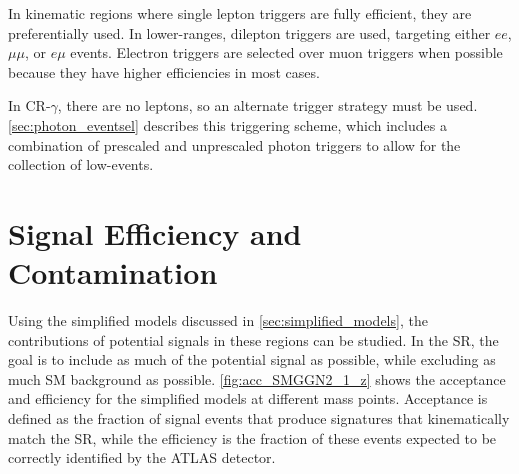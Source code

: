 In kinematic regions where single lepton triggers are fully efficient, they are preferentially used. In lower-\pt ranges, dilepton triggers are used, targeting either $ee$, $\mu\mu$, or $e\mu$ events. Electron triggers are selected over muon triggers when possible because they have higher efficiencies in most cases.

In CR-$\gamma$, there are no leptons, so an alternate trigger strategy must be used. \autoref{sec:photon_eventsel} describes this triggering scheme, which includes a combination of prescaled and unprescaled photon triggers to allow for the collection of low-\pt \gjets events. 


\section{Signal Efficiency and Contamination}

Using the simplified models discussed in \autoref{sec:simplified_models}, the contributions of potential signals in these regions can be studied. In the \ac{SR}, the goal is to include as much of the potential signal as possible, while excluding as much \ac{SM} background as possible. \autoref{fig:acc_SMGGN2_1_z} shows the acceptance and efficiency for the simplified models at different mass points. Acceptance is defined as the fraction of signal events that produce signatures that kinematically match the \ac{SR}, while the efficiency is the fraction of these events expected to be correctly identified by the ATLAS detector. 

